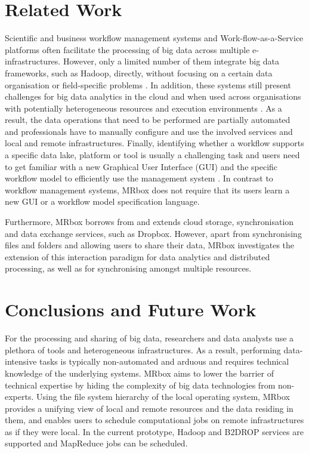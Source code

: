 \section{Related Work}
Scientific and business workflow management systems and Work-flow-as-a-Service platforms \cite[etc.]{kepler,pegasus,dare} often facilitate the processing of big data across multiple e-infrastructures. However, only a limited number of them integrate big data frameworks, such as Hadoop, directly, without focusing on a certain data organisation or field-specific problems \cite{wang2009kepler}. In addition, these systems still present challenges for big data analytics in the cloud and when used across organisations with potentially heterogeneous resources and execution environments \cite{khan2019big}. As a result, the data operations that need to be performed are partially automated and professionals have to manually configure and use the involved services and local and remote infrastructures. Finally, identifying whether a workflow supports a specific data lake, platform or tool is usually a challenging task and users need to get familiar with a new Graphical User Interface (GUI) and the specific workflow model to efficiently use the management system \cite{khan2019big, wang2009kepler}. In contrast to workflow management systems, MRbox does not require that its users learn a new GUI or a workflow model specification language.

Furthermore, MRbox borrows from and extends cloud storage, synchronisation and data exchange services, such as Dropbox. However, apart from synchronising files and folders and allowing users to share their data, MRbox investigates the extension of this interaction paradigm for data analytics and distributed processing, as well as for synchronising amongst multiple resources.

\section{Conclusions and Future Work}
For the processing and sharing of big data, researchers and data analysts use a plethora of tools and heterogeneous infrastructures. As a result, performing data-intensive tasks is typically non-automated and arduous and requires technical knowledge of the underlying systems. MRbox aims to lower the barrier of technical expertise by hiding the complexity of big data technologies from non-experts. Using the file system hierarchy of the local operating system, MRbox provides a unifying view of local and remote resources and the data residing in them, and enables users to schedule computational jobs on remote infrastructures as if they were local. In the current prototype, Hadoop and B2DROP services are supported and MapReduce jobs can be scheduled.

